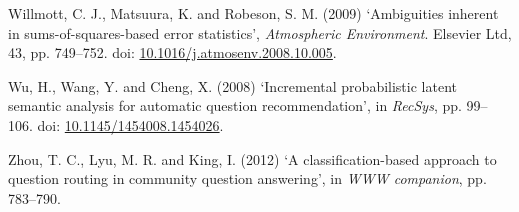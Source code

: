 \documentclass[11pt,preprint, authoryear]{article}
\begin{document}
\hypertarget{ref-Willmott2009}{}
Willmott, C. J., Matsuura, K. and Robeson, S. M. (2009) `Ambiguities
inherent in sums-of-squares-based error statistics', \emph{Atmospheric
Environment}. Elsevier Ltd, 43, pp. 749--752. doi:
\href{https://doi.org/10.1016/j.atmosenv.2008.10.005}{10.1016/j.atmosenv.2008.10.005}.

\hypertarget{ref-Wu2008}{}
Wu, H., Wang, Y. and Cheng, X. (2008) `Incremental probabilistic latent
semantic analysis for automatic question recommendation', in
\emph{RecSys}, pp. 99--106. doi:
\href{https://doi.org/10.1145/1454008.1454026}{10.1145/1454008.1454026}.

\hypertarget{ref-Zhou2012}{}
Zhou, T. C., Lyu, M. R. and King, I. (2012) `A classification-based
approach to question routing in community question answering', in
\emph{WWW companion}, pp. 783--790.

\newcommand\wordcount{
    \immediate\write18{texcount -sub=section \jobname.tex  | grep "Section" |     sed -e 's/+.*//' | sed -n \thesection p > 'count.txt'}
(words)}
\end{document}
